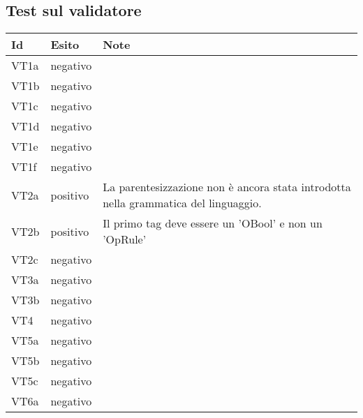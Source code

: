 \subsection{Test sul validatore}
\begin{center}
\begin{tabular}{|p{2cm}|p{4cm}|p{5cm}|} \hline
\textbf{Id} & \textbf{Esito} & \textbf{Note} \\ \hline
VT1a & negativo & \\ \hline
VT1b & negativo & \\ \hline
VT1c & negativo & \\ \hline
VT1d & negativo & \\ \hline
VT1e & negativo & \\ \hline
VT1f & negativo & \\ \hline
VT2a & positivo & La parentesizzazione non \`e ancora stata introdotta nella grammatica del linguaggio. \\ \hline
VT2b & positivo & Il primo tag deve essere un 'OBool' e non un 'OpRule' \\ \hline
VT2c & negativo & \\ \hline
VT3a & negativo & \\ \hline
VT3b & negativo & \\ \hline
VT4 & negativo & \\ \hline
VT5a & negativo & \\ \hline
VT5b & negativo & \\ \hline
VT5c & negativo & \\ \hline
VT6a & negativo & \\ \hline


\end{tabular}
\end{center}
